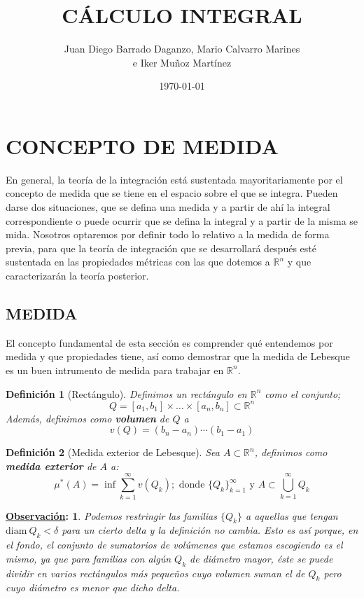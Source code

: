\documentclass[10pt,a4paper,openright]{book}
\title{CÁLCULO INTEGRAL}
\author{Juan Diego Barrado Daganzo, Mario Calvarro Marines \\ e Iker Muñoz Martínez}
\date{\today}
\theoremstyle{break}
\newtheorem*{defi}{Definición}
\newtheorem*{obs}{\underline{Observación}:}
\begin{document}
\maketitle
\chapter*{CONCEPTO DE MEDIDA}%
En general, la teoría de la integración está sustentada mayoritariamente por el concepto de medida que se tiene en el espacio sobre el que se integra. Pueden darse dos situaciones, que se defina una medida y a partir de ahí la integral correspondiente o puede ocurrir que se defina la integral y a partir de la misma se mida. Nosotros optaremos por definir todo lo relativo a la medida de forma previa, para que la teoría de integración que se desarrollará después esté sustentada en las propiedades métricas con las que dotemos a $\mathbb{R}^n$ y que caracterizarán la teoría posterior.
\label{sec:medidas}
\section*{MEDIDA}%
El concepto fundamental de esta sección es comprender qué entendemos por medida y que propiedades tiene, así como demostrar que la medida de Lebesque es un buen intrumento de medida para trabajar en $\mathbb{R}^n$.

\label{sub:definicion_de_medida_exterior}

\begin{defi}[Rectángulo]
Definimos un rectángulo en $\mathbb{R}^n$ como el conjunto;
$$Q = \left[ a_1, b_1 \right] \times \ldots \times \left[ a_n, b_n \right] \subset \mathbb{R}^{n}$$
Además, definimos como \textbf{volumen} de $Q$ a 
$$v\left( Q \right) = \left( b_n - a_n \right) \cdots \left( b_1 - a_1 \right)$$
\end{defi}

\begin{defi}[Medida exterior de Lebesque]
Sea $A \subset \mathbb{R}^{n}$, definimos como \textbf{medida exterior} de $A$ a:
$$
\mu^{*}(A) = \inf \sum_{k=1}^{\infty} v\left( Q_k \right); \text{ donde } \{Q_k\}_{k=1}^{\infty} \text{ y } A \subset \bigcup_{k = 1}^{\infty} Q_k
$$ 
\end{defi}

\begin{obs}
Podemos restringir las familias $\{Q_k\}$ a aquellas que tengan $\mathrm{diam}\ Q_k < \delta$ para un cierto delta y la definición no cambia. Esto es así porque, en el fondo, el conjunto de sumatorios de volúmenes que estamos escogiendo es el mismo, ya que para familias con algún $Q_k$ de diámetro mayor, éste se puede dividir en varios rectángulos más pequeños cuyo volumen suman el de $Q_k$ pero cuyo diámetro es menor que dicho delta.
\end{obs}
\end{document}
